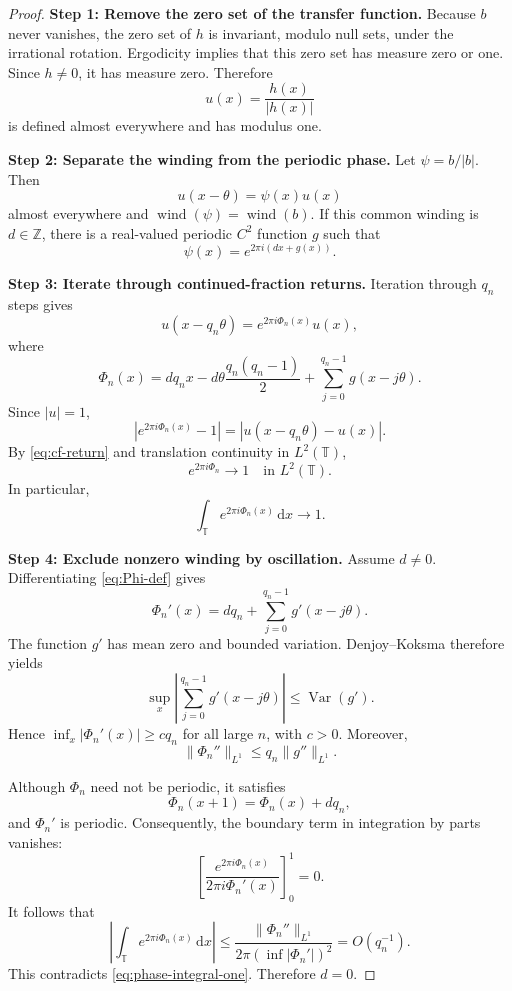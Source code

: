 \documentclass[reqno]{amsart}
\theoremstyle{remark}
\numberwithin{equation}{section}
\newcommand{\Z}{\mathbb{Z}}
\newcommand{\T}{\mathbb{T}}
\newcommand{\Var}{\operatorname{Var}}
\newcommand{\wind}{\operatorname{wind}}
\newcommand{\dd}{\,\mathrm{d}}
\begin{document}
\begin{proof}
\textbf{Step 1: Remove the zero set of the transfer function.}
Because \(b\) never vanishes, the zero set of \(h\) is invariant, modulo null
sets, under the irrational rotation. Ergodicity implies that this zero set has
measure zero or one. Since \(h\neq0\), it has measure zero. Therefore
\[
  u(x)=\frac{h(x)}{|h(x)|}
\]
is defined almost everywhere and has modulus one.

\smallskip
\noindent
\textbf{Step 2: Separate the winding from the periodic phase.}
Let \(\psi=b/|b|\). Then
\[
  u(x-\theta)=\psi(x)u(x)
\]
almost everywhere and \(\wind(\psi)=\wind(b)\). If this common winding is
\(d\in\Z\), there is a real-valued periodic \(C^2\) function \(g\) such that
\[
  \psi(x)=e^{2\pi i(dx+g(x))}.
\]

\smallskip
\noindent
\textbf{Step 3: Iterate through continued-fraction returns.}
Iteration through \(q_n\) steps gives
\[
  u(x-q_n\theta)=e^{2\pi i\Phi_n(x)}u(x),
\]
where
\begin{equation}
  \Phi_n(x)
  =dq_nx-d\theta\frac{q_n(q_n-1)}2
   +\sum_{j=0}^{q_n-1}g(x-j\theta).
  \label{eq:Phi-def}
\end{equation}
Since \(|u|=1\),
\[
  |e^{2\pi i\Phi_n(x)}-1|
  =|u(x-q_n\theta)-u(x)|.
\]
By \eqref{eq:cf-return} and translation continuity in \(L^2(\T)\),
\begin{equation}
  e^{2\pi i\Phi_n}\longrightarrow1
  \quad\text{in }L^2(\T).
  \label{eq:phase-to-one}
\end{equation}
In particular,
\begin{equation}
  \int_\T e^{2\pi i\Phi_n(x)}\dd x\longrightarrow1.
  \label{eq:phase-integral-one}
\end{equation}

\smallskip
\noindent
\textbf{Step 4: Exclude nonzero winding by oscillation.}
Assume \(d\neq0\). Differentiating \eqref{eq:Phi-def} gives
\[
  \Phi_n'(x)
  =dq_n+\sum_{j=0}^{q_n-1}g'(x-j\theta).
\]
The function \(g'\) has mean zero and bounded variation. Denjoy--Koksma
therefore yields
\[
  \sup_x\left|
    \sum_{j=0}^{q_n-1}g'(x-j\theta)
  \right|
  \leq\Var(g').
\]
Hence \(\inf_x|\Phi_n'(x)|\geq c q_n\) for all large \(n\), with \(c>0\).
Moreover,
\[
  \|\Phi_n''\|_{L^1}
  \leq q_n\|g''\|_{L^1}.
\]

Although \(\Phi_n\) need not be periodic, it satisfies
\[
  \Phi_n(x+1)=\Phi_n(x)+dq_n,
\]
and \(\Phi_n'\) is periodic. Consequently, the boundary term in integration
by parts vanishes:
\[
  \left[
    \frac{e^{2\pi i\Phi_n(x)}}{2\pi i\Phi_n'(x)}
  \right]_{0}^{1}=0.
\]
It follows that
\[
  \left|
    \int_\T e^{2\pi i\Phi_n(x)}\dd x
  \right|
  \leq
  \frac{\|\Phi_n''\|_{L^1}}
       {2\pi(\inf|\Phi_n'|)^2}
  =O(q_n^{-1}).
\]
This contradicts \eqref{eq:phase-integral-one}. Therefore \(d=0\).
\end{proof}
\end{document}

